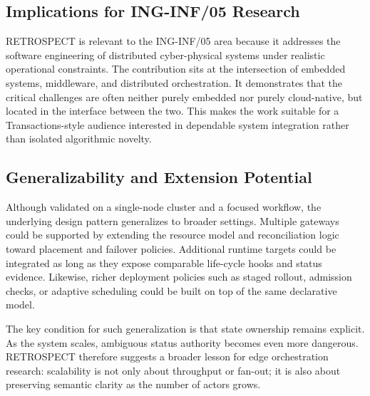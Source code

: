 \subsection{Implications for ING-INF/05 Research}
RETROSPECT is relevant to the ING-INF/05 area because it addresses the software engineering of distributed cyber-physical systems under realistic operational constraints. The contribution sits at the intersection of embedded systems, middleware, and distributed orchestration. It demonstrates that the critical challenges are often neither purely embedded nor purely cloud-native, but located in the interface between the two. This makes the work suitable for a Transactions-style audience interested in dependable system integration rather than isolated algorithmic novelty.

\subsection{Generalizability and Extension Potential}
Although validated on a single-node cluster and a focused workflow, the underlying design pattern generalizes to broader settings. Multiple gateways could be supported by extending the resource model and reconciliation logic toward placement and failover policies. Additional runtime targets could be integrated as long as they expose comparable life-cycle hooks and status evidence. Likewise, richer deployment policies such as staged rollout, admission checks, or adaptive scheduling could be built on top of the same declarative model.

The key condition for such generalization is that state ownership remains explicit. As the system scales, ambiguous status authority becomes even more dangerous. RETROSPECT therefore suggests a broader lesson for edge orchestration research: scalability is not only about throughput or fan-out; it is also about preserving semantic clarity as the number of actors grows.

